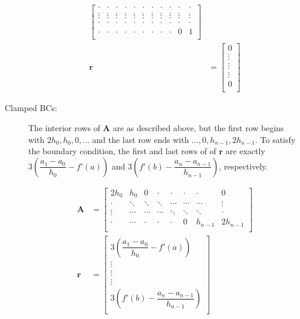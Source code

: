 \documentclass[11pt]{article}
\begin{document}
\begin{description}
\begin{align*}
\begin{bmatrix}
\cdot & \cdot & \cdot & \cdot & \cdot & \cdot & \cdot & \cdot & \cdot &\cdot & \cdot \\
\vdots & \vdots & \vdots & \vdots & \vdots & \vdots & \vdots & \vdots & \vdots &\vdots & \vdots \\
\cdot & \cdot & \cdot & \cdot & \cdot & \cdot & \cdot & \cdot & \cdot &\cdot & \cdot \\
\cdot & \cdot & \cdot & \cdot & \cdot & \cdot & \cdot & \cdot & \cdot &0 & 1 \\
\end{bmatrix}\\
\mathbf{r} & = 
\left[\begin{array}{c}
0 \\
\vdots \\
\vdots \\
\vdots\\
0 \\
\end{array}\right]
\end{align*}
\item[Clamped BCs:] The interior rows of \(\mathbf{A}\) are as described above, but the first row begins with \(2h_0, h_0, 0, \dots\) and the last row ends with \(\dots, 0, h_{n-1}, 2h_{n-1}\). To satisfy the boundary condition, the first and last rows of of \(\mathbf{r}\) are exactly \(3\left(\dfrac{a_1-a_0}{h_0} -f'(a)\right)\) and \(3\left(f'(b) - \dfrac{a_n-a_{n-1}}{h_{n-1}}\right)\), respectively.

\begin{align*}
\mathbf{A} & = %
\begin{bmatrix}
2h_0 & h_0 & 0 &\cdot & \cdot & \cdot &\cdot & 0 \\
\cdot & \ddots & \ddots & \ddots & \cdots & \cdots &\cdots & \vdots \\
\vdots & \cdots & \cdots & \cdots & \ddots & \ddots &\ddots & \cdot \\
\cdot & \cdots & \cdot & \cdot & \cdot & 0 &h_{n-1} & 2h_{n-1} \\
\end{bmatrix}\\
\mathbf{r} & = 
\left[\begin{array}{c}
3\left(\dfrac{a_1-a_0}{h_0} -f'(a)\right) \\
\vdots \\
\vdots \\
\vdots\\
3\left(f'(b) - \dfrac{a_n-a_{n-1}}{h_{n-1}}\right) \\
\end{array}\right]
\end{align*}


\end{description}
\end{document}
